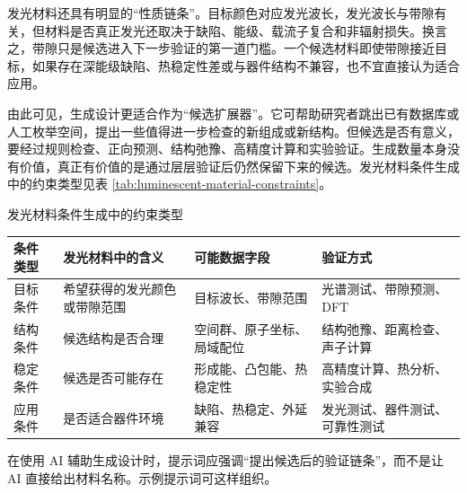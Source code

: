 发光材料还具有明显的“性质链条”。目标颜色对应发光波长，发光波长与带隙有关，但材料是否真正发光还取决于缺陷、能级、载流子复合和非辐射损失。换言之，带隙只是候选进入下一步验证的第一道门槛。一个候选材料即使带隙接近目标，如果存在深能级缺陷、热稳定性差或与器件结构不兼容，也不宜直接认为适合应用。

由此可见，生成设计更适合作为“候选扩展器”。它可帮助研究者跳出已有数据库或人工枚举空间，提出一些值得进一步检查的新组成或新结构。但候选是否有意义，要经过规则检查、正向预测、结构弛豫、高精度计算和实验验证。生成数量本身没有价值，真正有价值的是通过层层验证后仍然保留下来的候选。发光材料条件生成中的约束类型见表 \ref{tab:luminescent-material-constraints}。

\begin{formalTable}[htbp]
\caption{发光材料条件生成中的约束类型}
\label{tab:luminescent-material-constraints}
\footnotesize
\begin{tabularx}{\textwidth}{@{}YYYY@{}}
\toprule
\textbf{条件类型} & \textbf{发光材料中的含义} & \textbf{可能数据字段} & \textbf{验证方式} \\
\midrule
目标条件 & 希望获得的发光颜色或带隙范围 & 目标波长、带隙范围 & 光谱测试、带隙预测、DFT \\
结构条件 & 候选结构是否合理 & 空间群、原子坐标、局域配位 & 结构弛豫、距离检查、声子计算 \\
稳定条件 & 候选是否可能存在 & 形成能、凸包能、热稳定性 & 高精度计算、热分析、实验合成 \\
应用条件 & 是否适合器件环境 & 缺陷、热稳定、外延兼容 & 发光测试、器件测试、可靠性测试 \\
\bottomrule
\end{tabularx}
\end{formalTable}

在使用 AI 辅助生成设计时，提示词应强调“提出候选后的验证链条”，而不是让 AI 直接给出材料名称。示例提示词可这样组织。

